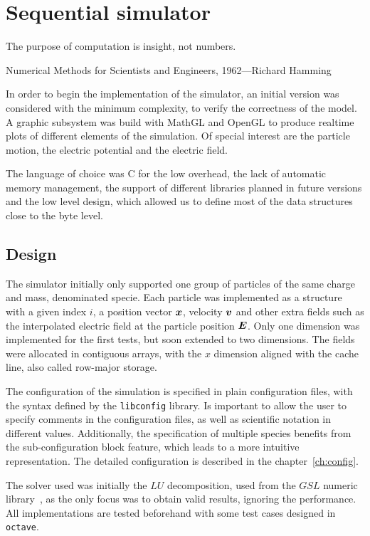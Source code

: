 \chapter{Sequential simulator}
\label{ch:sequential}

\epigraph{The purpose of computation is insight, not numbers.}{Numerical Methods 
for Scientists and Engineers, 1962---Richard Hamming}

In order to begin the implementation of the simulator, an initial version was
considered with the minimum complexity, to verify the correctness of the model.
A graphic subsystem was build with MathGL and OpenGL to produce realtime plots
of different elements of the simulation. Of special interest are the particle
motion, the electric potential and the electric field.

The language of choice was C for the low overhead, the lack of automatic memory
management, the support of different libraries planned in future versions and
the low level design, which allowed us to define most of the data structures
close to the byte level.

\section{Design}

The simulator initially only supported one group of particles of the same charge
and mass, denominated specie. Each particle was implemented as a structure with
a given index $i$, a position vector $\bm{x}$, velocity $\bm{v}$ and other extra fields
such as the interpolated electric field at the particle position $\bm{E}$.
%
Only one dimension was implemented for the first tests, but soon extended to two 
dimensions.  The fields were allocated in contiguous arrays, with the $x$ 
dimension aligned with the cache line, also called row-major storage.

The configuration of the simulation is specified in plain configuration files,
with the syntax defined by the \texttt{libconfig} library. Is important to allow
the user to specify comments in the configuration files, as well as scientific
notation in different values. Additionally, the specification of multiple species
benefits from the sub-configuration block feature, which leads to a more
intuitive representation. The detailed configuration is described in the
chapter~\ref{ch:config}.

The solver used was initially the $LU$ decomposition, used from the $GSL$
numeric library~\cite{gsl}, as the only focus was to obtain valid results, ignoring the
performance. All implementations are tested beforehand with some test cases
designed in \texttt{octave}.

